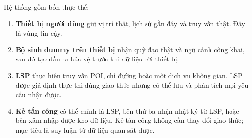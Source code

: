 \documentclass[12pt,a4paper,oneside]{report}
\begin{document}
Hệ thống gồm bốn thực thể:

\begin{enumerate}
  \item \textbf{Thiết bị người dùng} giữ vị trí thật, lịch sử gần đây và truy vấn thật. Đây là vùng tin cậy.
  \item \textbf{Bộ sinh dummy trên thiết bị} nhận quỹ đạo thật và ngữ cảnh công khai, sau đó tạo đầu ra bảo vệ trước khi dữ liệu rời thiết bị.
  \item \textbf{LSP} thực hiện truy vấn POI, chỉ đường hoặc một dịch vụ không gian. LSP được giả định thực thi đúng giao thức nhưng có thể lưu và phân tích mọi yêu cầu nhận được.
  \item \textbf{Kẻ tấn công} có thể chính là LSP, bên thứ ba nhận nhật ký từ LSP, hoặc bên xâm nhập được kho dữ liệu. Kẻ tấn công không cần thay đổi giao thức; mục tiêu là suy luận từ dữ liệu quan sát được.
\end{enumerate}
\end{document}
